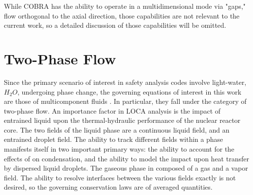 While COBRA has the ability to operate in a multidimensional mode via "gaps," flow orthogonal to the axial direction, those capabilities are not relevant to the current work, so a detailed discussion of those capabilities will be omitted.
\section{Two-Phase Flow}
\label{sect:two_phase_flow}
Since the primary scenario of interest in safety analysis codes involve light-water, $H_2 O$, undergoing phase change, the governing equations of interest in this work are those of multicomponent fluids \cite{Drew1998}.
In particular, they fall under the category of two-phase flow.
An importance factor in LOCA analysis is the impact of entrained liquid upon the thermal-hydraulic performance of the nuclear reactor core.
The two fields of the liquid phase are a continuous liquid field, and an entrained droplet field.
The ability to track different fields within a phase manifests itself in two important primary ways: the ability to account for the effects of \ncgs on condensation, and the ability to model the impact upon heat transfer by dispersed liquid droplets.
The gaseous phase in composed of a \ncg gas and a vapor field. 
The ability to resolve interfaces between the various fields exactly is not desired, so the governing conservation laws are of averaged quantities.

